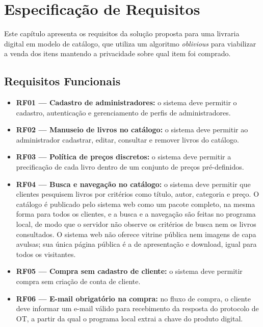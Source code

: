 \chapter{Especificação de Requisitos}\label{cap:especificacao}

Este capítulo apresenta os requisitos da solução proposta para uma livraria
digital em modelo de catálogo, que utiliza um algoritmo \emph{oblivious} para
viabilizar a venda dos itens mantendo a privacidade sobre qual item foi
comprado.

\section{Requisitos Funcionais}

\begin{itemize}
\item \textbf{RF01 --- Cadastro de administradores:} o sistema deve permitir o
cadastro, autenticação e gerenciamento de perfis de administradores.

\item \textbf{RF02 --- Manuseio de livros no catálogo:} o sistema deve
permitir ao administrador cadastrar, editar, consultar e remover livros do
catálogo.

\item \textbf{RF03 --- Política de preços discretos:} o sistema deve permitir
a precificação de cada livro dentro de um conjunto de preços pré-definidos.

\item \textbf{RF04 --- Busca e navegação no catálogo:} o sistema deve permitir
que clientes pesquisem livros por critérios como título, autor, categoria e
preço. O catálogo é publicado pelo sistema web como um pacote completo, na
mesma forma para todos os clientes, e a busca e a navegação são feitas no
programa local, de modo que o servidor não observe os critérios de busca nem
os livros consultados. O sistema web não oferece vitrine pública nem imagens
de capa avulsas; sua única página pública é a de apresentação e download, igual
para todos os visitantes.

\item \textbf{RF05 --- Compra sem cadastro de cliente:} o sistema deve
permitir compra sem criação de conta de cliente.

\item \textbf{RF06 --- E-mail obrigatório na compra:} no fluxo de compra, o
cliente deve informar um e-mail válido para recebimento da resposta do
protocolo de OT, a partir da qual o programa local extrai a chave do produto
digital.


\end{itemize}
